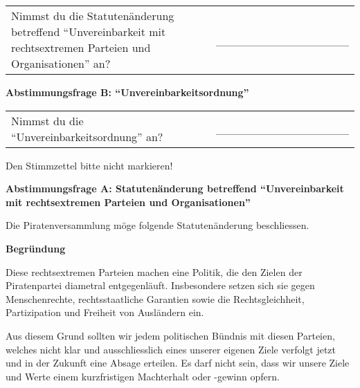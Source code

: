 \documentclass[11pt, a4paper]{scrartcl}
\begin{document}
{\begin{minipage}[t][12.5cm][t]{17.4cm}
\begin{tabular}{ b{13.5cm} b{3cm} }
Nimmst du die Statutenänderung betreffend \enquote{Unvereinbarkeit mit rechtsextremen Parteien und Organisationen} an?
& \_\_\_\_\_\_\_\_\_\_\_\_\_\_\_\_ \\
\end{tabular}

\vspace{0.5cm}

\textbf{Abstimmungsfrage B: \enquote{Unvereinbarkeitsordnung}}

\vspace{0.5cm}

\begin{tabular}{ b{13.5cm} b{3cm} }
Nimmst du die \enquote{Unvereinbarkeitsordnung} an?
& \_\_\_\_\_\_\_\_\_\_\_\_\_\_\_\_ \\
\end{tabular}

\vspace{1.5cm}

Den Stimmzettel bitte nicht markieren!

\end{minipage}

\newpage

\setlength{\parindent}{0cm}
\setlength{\parskip}{0.2cm}




{\Large\textbf{Abstimmungsfrage A: Statutenänderung betreffend \enquote{Unvereinbarkeit mit rechtsextremen Parteien und Organisationen}}}

Die Piratenversammlung möge folgende Statutenänderung beschliessen.


\vspace{0.2cm}

\textbf{Begründung}

Diese rechtsextremen Parteien machen eine Politik, die den Zielen der Piratenpartei diametral entgegenläuft. Insbesondere setzen sich sie gegen Menschenrechte, rechtsstaatliche Garantien sowie die Rechtsgleichheit, Partizipation und Freiheit von Ausländern ein.

Aus diesem Grund sollten wir jedem politischen Bündnis mit diesen Parteien, welches nicht klar und ausschliesslich eines unserer eigenen Ziele verfolgt jetzt und in der Zukunft eine Absage erteilen. Es darf nicht sein, dass wir unsere Ziele und Werte einem kurzfristigen Machterhalt oder -gewinn opfern.

}
\end{document}
